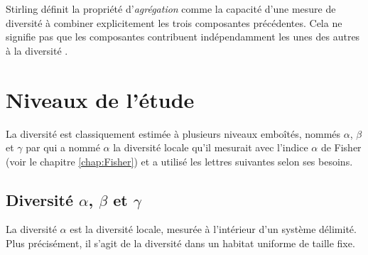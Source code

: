 \documentclass[
  11pt,
  french,
  a4paper,
  extrafontsizes,onecolumn,openright
  ]{memoir}
\begin{document}
Stirling définit la propriété d'\emph{agrégation} comme la capacité d'une mesure de diversité à combiner explicitement les trois composantes précédentes.
Cela ne signifie pas que les composantes contribuent indépendamment les unes des autres à la diversité \autocite{Jost2010}.

\hypertarget{niveaux-de-luxe9tude}{%
\section{Niveaux de l'étude}\label{niveaux-de-luxe9tude}}

La diversité est classiquement estimée à plusieurs niveaux emboîtés, nommés \(\alpha\), \(\beta\) et \(\gamma\) par \textcite[page 320]{Whittaker1960} qui a nommé \(\alpha\) la diversité locale qu'il mesurait avec l'indice \(\alpha\) de Fisher (voir le chapitre \ref{chap:Fisher}) et a utilisé les lettres suivantes selon ses besoins.

\hypertarget{diversituxe9-alpha-beta-et-gamma}{%
\subsection{\texorpdfstring{Diversité \(\alpha\), \(\beta\) et \(\gamma\)}{Diversité \textbackslash alpha, \textbackslash beta et \textbackslash gamma}}\label{diversituxe9-alpha-beta-et-gamma}}

La diversité \(\alpha\) est la diversité locale, mesurée à l'intérieur d'un système délimité.
Plus précisément, il s'agit de la diversité dans un habitat uniforme de taille fixe.



\scriptsize
\end{document}
